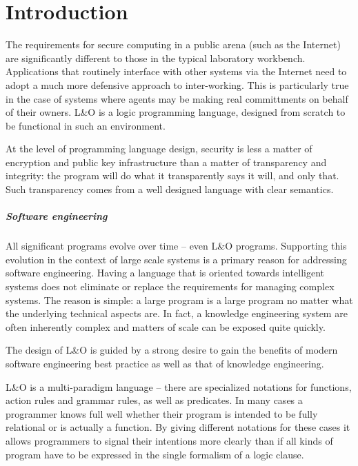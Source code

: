 \chapter{Introduction}
The requirements for secure computing in a public arena (such as the Internet) are significantly different to those in the typical laboratory workbench. Applications that routinely interface with other systems via the Internet need to adopt a much more defensive approach to inter-working. This is particularly true in the case of systems where agents may be making real committments on behalf of their owners.  L&O is a logic programming language, designed from scratch to be functional in such an environment.

At the level of programming language design, security is less a matter of encryption and public key infrastructure than a matter of transparency and integrity: the program will do what it transparently says it will, and only that. Such transparency comes from a well designed language with clear semantics. 

\paragraph{Software engineering}
All significant programs evolve over time -- even L&O programs. Supporting this evolution in the context of large scale systems is a primary reason for addressing software engineering. Having a language that is oriented towards intelligent systems does not eliminate or replace the requirements for managing complex systems. The reason is simple: a large program is a large program no matter what the underlying technical aspects are. In fact, a knowledge engineering system are often inherently complex and matters of scale can be exposed quite quickly.

The design of L&O is guided by a strong desire to gain the benefits of modern software engineering best practice as well as that of knowledge engineering. 

L&O is a multi-paradigm language -- there are specialized notations for  functions, action rules and grammar rules, as well as predicates. In many cases a programmer knows full well whether their program is intended to be fully relational or is actually a function. By giving different notations for these cases it allows programmers to signal their intentions more clearly than if all kinds of program have to be expressed in the single formalism of a logic clause.

